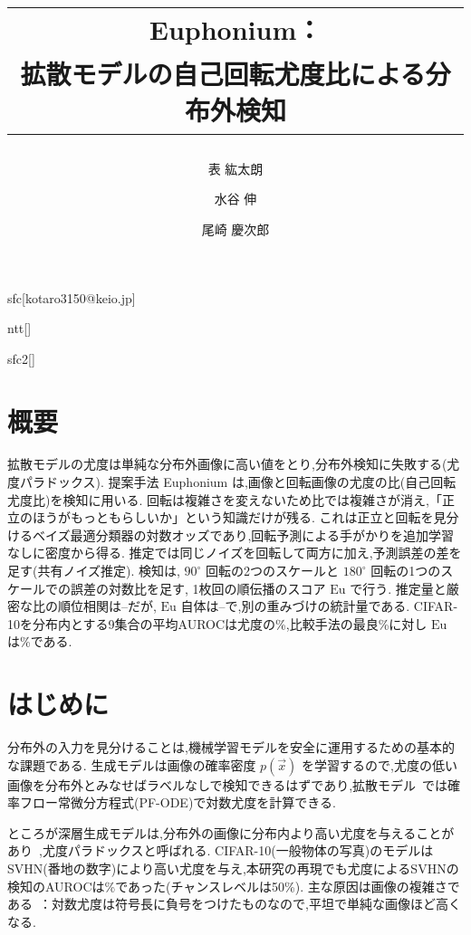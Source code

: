 \documentclass[MIRU,submit,onecolumn]{miru2025j}
\newcommand{\Eu}{\mathrm{Eu}}        %
\begin{document}
\title{\begin{tabular}[c]{@{}c@{}}\raisebox{2.7pt}{\scalebox{0.75}{\euphoniumicon}}\hspace{1.2mm}\textbf{Euphonium：}\\[3pt]%
  \textbf{拡散モデルの自己回転尤度比による分布外検知}\end{tabular}}
\author{表 紘太朗}{}{sfc}[kotaro3150@keio.jp]
\author{水谷 伸}{}{ntt}[]
\author{尾崎 慶次郎}{}{sfc2}[]
\maketitle

\section*{概要}
拡散モデルの尤度は単純な分布外画像に高い値をとり,分布外検知に失敗する(尤度パラドックス).%
提案手法 Euphonium は,画像と回転画像の尤度の比(自己回転尤度比)を検知に用いる.%
回転は複雑さを変えないため比では複雑さが消え,「正立のほうがもっともらしいか」という知識だけが残る.%
これは正立と回転を見分けるベイズ最適分類器の対数オッズであり,回転予測による手がかりを追加学習なしに密度から得る.%
推定では同じノイズを回転して両方に加え,予測誤差の差を足す(共有ノイズ推定).%
検知は, $90^\circ$ 回転の2つのスケールと $180^\circ$ 回転の1つのスケールでの誤差の対数比を足す, 1枚\nfeG{}回の順伝播のスコア $\Eu$ で行う.%
推定量と厳密な比の順位相関は\rhoEstMin{}--\rhoEstMax{}だが, $\Eu$ 自体は\rhoGMin{}--\rhoGMax{}で,別の重みづけの統計量である. %
CIFAR-10を分布内とする9集合の平均AUROCは尤度の\tabMeanNLL\%,比較手法の最良\bestBaseCten\%に対し $\Eu$ は\tabMeanG\%である.
\section{はじめに}
分布外の入力を見分けることは,機械学習モデルを安全に運用するための基本的な課題である.%
生成モデルは画像の確率密度 $p(\vec{x})$ を学習するので,尤度の低い画像を分布外とみなせばラベルなしで検知できるはずであり,拡散モデル~\cite{song2021score,karras2022edm}では確率フロー常微分方程式(PF-ODE)で対数尤度を計算できる.

ところが深層生成モデルは,分布外の画像に分布内より高い尤度を与えることがあり~\cite{nalisnick2019deep},尤度パラドックスと呼ばれる. %
CIFAR-10(一般物体の写真)のモデルはSVHN(番地の数字)により高い尤度を与え,本研究の再現でも尤度によるSVHNの検知のAUROCは\nllSVHN\%であった(チャンスレベルは50\%).%
主な原因は画像の複雑さである~\cite{serra2020input}：対数尤度は符号長に負号をつけたものなので,平坦で単純な画像ほど高くなる.
\end{document}
